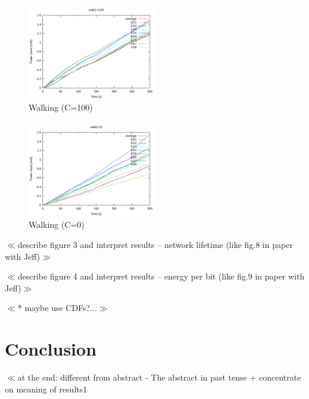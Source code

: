 \documentclass{article}
\begin{document}
\begin{figure}[htb]
\begin{center}
\includegraphics[width=0.5\textwidth]{figures/walk2-c100.pdf}
\end{center}
\caption{Walking (C=100)}
\label{fig:walk2-c100}
\end{figure}

\begin{figure}[htb]
\begin{center}
\includegraphics[width=0.5\textwidth]{figures/walk2-c0.pdf}
\end{center}
\caption{Walking (C=0)}
\label{fig:walk2-c0}
\end{figure}

$\ll$describe figure  3 and interpret results – network lifetime (like fig.8 in paper with Jeff)$\gg$ 

$\ll$describe figure  4 and interpret results – energy per bit (like fig.9 in paper with Jeff)$\gg$ 

$\ll$* maybe use CDFs?...$\gg$

\section{Conclusion}
$\ll$at the end: different from abstract -  The abstract in past tense + concentrate on meaning of results1

{}

\end{document}
